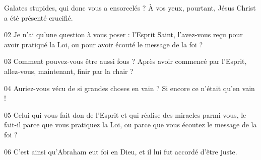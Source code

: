 Galates stupides, qui donc vous a ensorcelés ? À vos yeux, pourtant, Jésus Christ a été présenté crucifié.

02 Je n’ai qu’une question à vous poser : l’Esprit Saint, l’avez-vous reçu pour avoir pratiqué la Loi, ou pour avoir écouté le message de la foi ?

03 Comment pouvez-vous être aussi fous ? Après avoir commencé par l’Esprit, allez-vous, maintenant, finir par la chair ?

04 Auriez-vous vécu de si grandes choses en vain ? Si encore ce n’était qu’en vain !

05 Celui qui vous fait don de l’Esprit et qui réalise des miracles parmi vous, le fait-il parce que vous pratiquez la Loi, ou parce que vous écoutez le message de la foi ?

06 C’est ainsi qu’Abraham eut foi en Dieu, et il lui fut accordé d’être juste.

